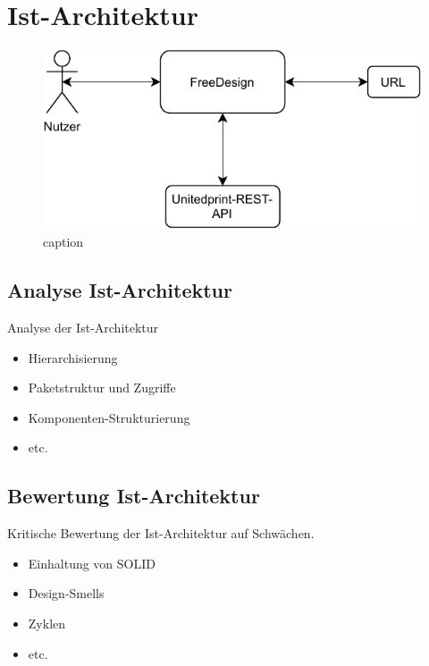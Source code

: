 \section{Ist-Architektur}

\begin{figure}[h]
  \caption{caption}
  \centering
  \includegraphics{diagrams/Freedesign_Interaktion.pdf}
\end{figure}




\subsection{Analyse Ist-Architektur}
Analyse der Ist-Architektur
\begin{itemize}
\item Hi­e­r­ar­chi­sie­rung
\item Paketstruktur und Zugriffe
\item Komponenten-Strukturierung
\item etc.
\end{itemize}

\subsection{Bewertung Ist-Architektur}
Kritische Bewertung der Ist-Architektur auf Schwächen.
\begin{itemize}
\item Einhaltung von SOLID
\item Design-Smells
\item Zyklen
\item etc.
\end{itemize}
